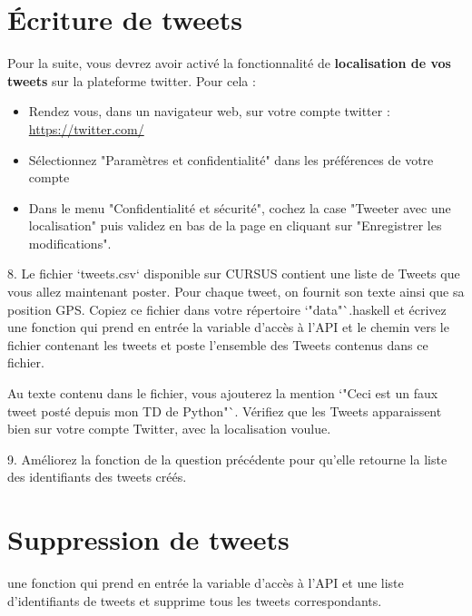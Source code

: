 \documentclass[11pt,a4paper]{article}
\begin{document}
\section{Écriture de tweets}

Pour la suite, vous devrez avoir activé la fonctionnalité de \textbf{localisation de vos tweets} sur la plateforme twitter. Pour cela :

\begin{itemize}
\item Rendez vous, dans un navigateur web, sur votre compte twitter : \url{https://twitter.com/}
\item  Sélectionnez "Paramètres et confidentialité" dans les préférences de votre compte
\item  Dans le menu "Confidentialité et sécurité", cochez la case "Tweeter avec une localisation" puis validez en bas de la page en cliquant sur "Enregistrer les modifications".
\end{itemize}

8. Le fichier `tweets.csv` disponible sur CURSUS contient une liste de Tweets que vous allez maintenant poster. Pour chaque tweet, on fournit son texte ainsi que sa position GPS. Copiez ce fichier dans votre répertoire `"data"`{.haskell} et écrivez une fonction qui prend en entrée la variable d'accès à l'API et le chemin vers le fichier contenant les tweets et poste l'ensemble des Tweets contenus dans ce fichier.

Au texte contenu dans le fichier, vous ajouterez la mention `"Ceci est un faux tweet posté depuis mon TD de Python"`. Vérifiez que les Tweets apparaissent bien sur votre compte Twitter, avec la localisation voulue.



9. Améliorez la fonction de la question précédente pour qu'elle retourne la liste des identifiants des tweets créés.

\section{Suppression de tweets}

\begin{enumerate}
     une fonction qui prend en entrée la variable d'accès à l'API et une liste d'identifiants de tweets et supprime tous les tweets correspondants.
\end{enumerate}
\end{document}
